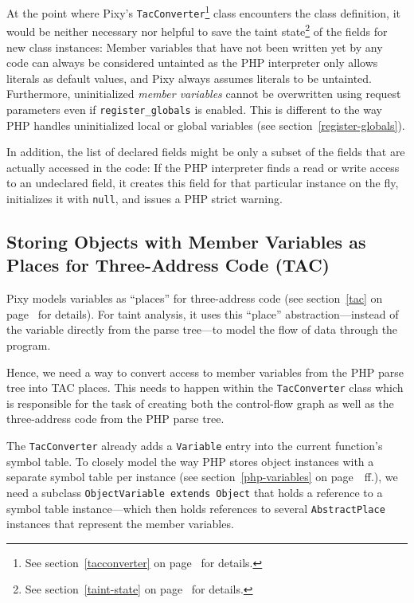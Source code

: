 At the point where Pixy's \texttt{TacConverter}\footnote{See section~\ref{tacconverter} on page~\pageref{tacconverter} for details.} class encounters the class definition, it would be neither necessary nor helpful to save the taint state\footnote{See section~\ref{taint-state} on page~\pageref{taint-state} for details.}\label{fields-not-saved-on-new} of the fields for new class instances: Member variables that have not been written yet by any code can always be considered untainted as the PHP interpreter only allows literals as default values, and Pixy always assumes literals to be untainted. Furthermore, uninitialized \emph{member variables} cannot be overwritten using request parameters even if \texttt{register\_globals} is enabled. This is different to the way PHP handles uninitialized local or global variables (see section~\ref{register-globals}).

In addition, the list of declared fields might be only a subset of the fields that are actually accessed in the code: If the PHP interpreter finds a read or write access to an undeclared field, it creates this field for that particular instance on the fly, initializes it with \texttt{null}, and issues a PHP strict warning.



\subsection{Storing Objects with Member Variables as Places for Three-Address Code (TAC)}

Pixy models variables as ``places'' for three-address code (see section~\ref{tac} on page~\pageref{tac} for details). For taint analysis, it uses this ``place'' abstraction---instead of the variable directly from the parse tree---to model the flow of data through the program.

Hence, we need a way to convert access to member variables from the PHP parse tree into TAC places. This needs to happen within the \texttt{TacConverter} class which is responsible for the task of creating both the control-flow graph as well as the three-address code from the PHP parse tree.

The \texttt{TacConverter} already adds a \texttt{Variable} entry into the current function's symbol table. To closely model the way PHP stores object instances with a separate symbol table per instance (see section~\ref{php-variables} on page~\pageref{php-variables}~ff.), we need a subclass \texttt{ObjectVariable extends Object} that holds a reference to a symbol table instance---which then holds references to several \texttt{AbstractPlace} instances that represent the member variables.


